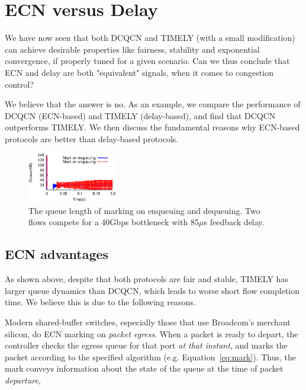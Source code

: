 \vspace{-0.5em}
\section {ECN versus Delay}
\label{sec:discuss}

We have now seen that both DCQCN and TIMELY (with a small modification) can achieve
desirable properties like fairness, stability and exponential convergence, if 
properly tuned for a given scenario. Can we thus conclude
that ECN and delay are both "equivalent" signals, when it comes to congestion
control? 

We believe that the answer is no. As an example, we compare the performance of 
DCQCN (ECN-based) and TIMELY (delay-based), and find that DCQCN outperforms TIMELY. 
We then discuss the fundamental reasons why ECN-based protocols are better than delay-based 
protocols. 





\begin{figure}[t]
\center
\includegraphics[width=0.35\textwidth]{figures/dcqcn_bufferbloat.eps}
\caption{The queue length of marking on enqueuing and dequeuing. 
Two flows compete for a 40Gbps bottleneck with 85$\mu$s feedback delay.}
\vspace{-1.5em}
\label{fig:dcqcn_bufferbloat}
\end{figure}
\fi

\vspace{-0.5em}
\subsection{ECN advantages}
\label{sec:ecn_advantages}

As shown above, despite that both protocols are fair and stable, TIMELY has larger
queue dynamics than DCQCN, which leads to worse short flow completion time. 
We believe this is due to the following reasons.

Modern shared-buffer switches, especially those that use Broadcom's merchant
silicon, do ECN marking on {\em packet egress}. When a packet is ready to
depart, the controller checks the egress queue for that port {\em at that
instant}, and marks the packet according to the specified algorithm
(e.g.  Equation~\ref{eq:mark}). Thus, the mark  conveys information about the
state of the queue at the time of packet {\em departure}, 

